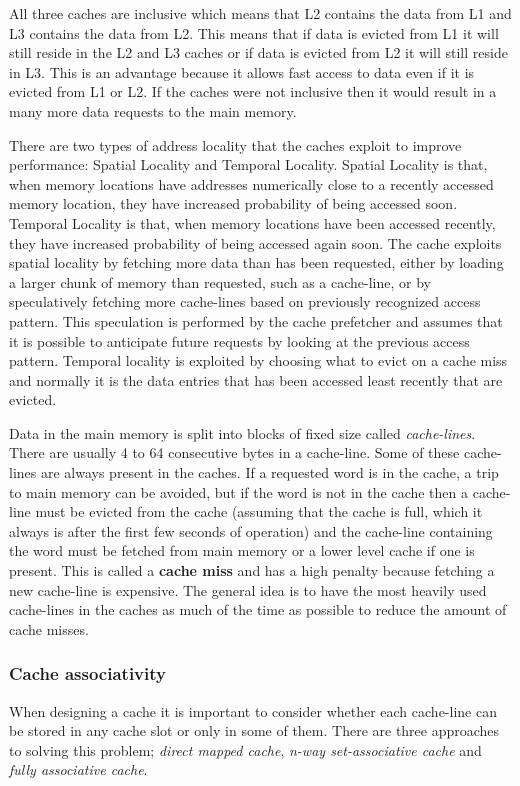 All three caches are inclusive which means that L2 contains the data from L1 and L3 contains the data from L2.
This means that if data is evicted from L1 it will still reside in the L2 and L3 caches or if data is evicted from L2 it will still reside in L3. 
This is an advantage because it allows fast access to data even if it is evicted from L1 or L2. 
If the caches were not inclusive then it would result in a many more data requests to the main memory.

There are two types of address locality that the caches exploit to improve performance: Spatial Locality and Temporal Locality.
Spatial Locality is that, when memory locations have addresses numerically close to a recently accessed memory location, they have increased probability of being accessed soon.
Temporal Locality is that, when memory locations have been accessed recently, they have increased probability of being accessed again soon.
The cache exploits spatial locality by fetching more data than has been requested, either by loading a larger chunk of memory than requested, such as a cache-line, or by speculatively fetching more cache-lines based on previously recognized access pattern.  This speculation is performed by the cache prefetcher and assumes that it is possible to anticipate future requests by looking at the previous access pattern.
Temporal locality is exploited by choosing what to evict on a cache miss and normally it is the data entries that has been accessed least recently that are evicted.

Data in the main memory is split into blocks of fixed size called \textit{cache-lines}. 
There are usually 4 to 64 consecutive bytes in a cache-line. 
Some of these cache-lines are always present in the caches. 
If a requested word is in the cache, a trip to main memory can be avoided, but if the word is not in the cache then a cache-line must be evicted from the cache (assuming that the cache is full, which it always is after the first few seconds of operation) and the cache-line containing the word must be fetched from main memory or a lower level cache if one is present. 
This is called a \textbf{cache miss} and has a high penalty because fetching a new cache-line is expensive.
The general idea is to have the most heavily used cache-lines in the caches as much of the time as possible to reduce the amount of cache misses.

\subsubsection{Cache associativity}
When designing a cache it is important to consider whether each cache-line can be stored in any cache slot or only in some of them.
There are three approaches to solving this problem; \textit{direct mapped cache}, \textit{n-way set-associative cache} and \textit{fully associative cache}. 

